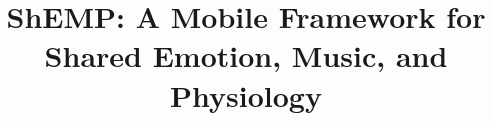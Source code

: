 \documentclass{sig-alternate}
\begin{document}
%

\title{
	{\ttlit ShEMP}: A Mobile Framework for Shared Emotion, Music, and Physiology
}
%
%
%
%
%
\end{document}
